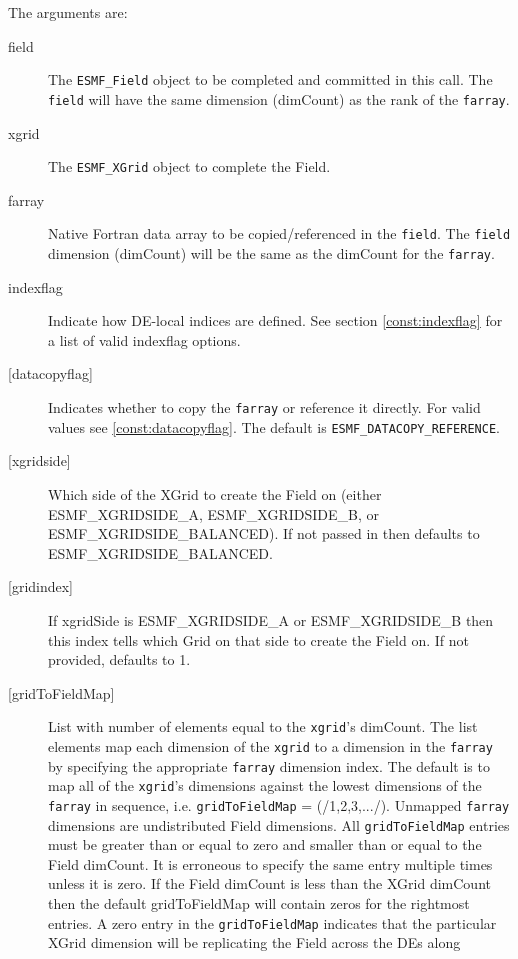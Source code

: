    The arguments are: 
   \begin{description} 
   \item [field] 
   The {\tt ESMF\_Field} object to be completed and 
   committed in this call. The {\tt field} will have the same dimension 
   (dimCount) as the rank of the {\tt farray}. 
   \item [xgrid] 
   The {\tt ESMF\_XGrid} object to complete the Field. 
   \item [farray] 
   Native Fortran data array to be copied/referenced in the {\tt field}. 
   The {\tt field} dimension (dimCount) will be the same as the dimCount 
   for the {\tt farray}. 
   \item [indexflag] 
   Indicate how DE-local indices are defined. See section 
   \ref{const:indexflag} for a list of valid indexflag options. 
   \item [{[datacopyflag]}] 
   Indicates whether to copy the {\tt farray} or reference it directly. 
   For valid values see \ref{const:datacopyflag}. The default is 
   {\tt ESMF\_DATACOPY\_REFERENCE}. 
   \item [{[xgridside]}] 
   Which side of the XGrid to create the Field on (either ESMF\_XGRIDSIDE\_A, 
   ESMF\_XGRIDSIDE\_B, or ESMF\_XGRIDSIDE\_BALANCED). If not passed in then 
   defaults to ESMF\_XGRIDSIDE\_BALANCED. 
   \item [{[gridindex]}] 
   If xgridSide is ESMF\_XGRIDSIDE\_A or ESMF\_XGRIDSIDE\_B then this index tells which Grid on 
   that side to create the Field on. If not provided, defaults to 1. 
   \item [{[gridToFieldMap]}] 
   List with number of elements equal to the 
   {\tt xgrid}'s dimCount. The list elements map each dimension 
   of the {\tt xgrid} to a dimension in the {\tt farray} by 
   specifying the appropriate {\tt farray} dimension index. The 
   default is to map all of the {\tt xgrid}'s dimensions against the 
   lowest dimensions of the {\tt farray} in sequence, i.e. 
   {\tt gridToFieldMap} = (/1,2,3,.../). 
   Unmapped {\tt farray} dimensions are undistributed Field 
   dimensions. 
   All {\tt gridToFieldMap} entries must be greater than or equal 
   to zero and smaller than or equal to the Field dimCount. It is erroneous 
   to specify the same entry multiple times unless it is zero. 
   If the Field dimCount is less than the XGrid dimCount then the default 
   gridToFieldMap will contain zeros for the rightmost entries. A zero 
   entry in the {\tt gridToFieldMap} indicates that the particular 
   XGrid dimension will be replicating the Field across the DEs along 

\end{description}
